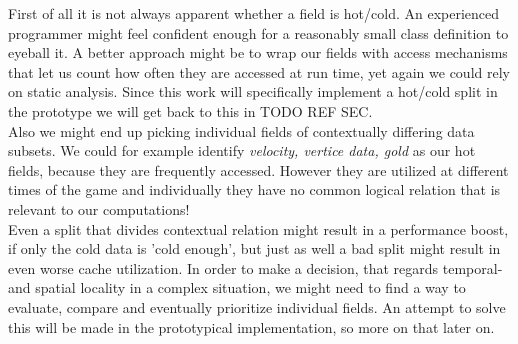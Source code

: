 First of all it is not always apparent whether a field is hot/cold. An experienced programmer might feel confident enough for a reasonably small class definition to eyeball it. A better approach might be to wrap our fields with access mechanisms that let us count how often they are accessed at run time, yet again we could rely on static analysis. Since this work will specifically implement a hot/cold split in the prototype we will get back to this in TODO REF SEC.\\
Also we might end up picking individual fields of contextually differing data subsets. We could for example identify \textit{velocity, vertice data, gold} as our hot fields, because they are frequently accessed. However they are utilized at different times of the game and individually they have no common logical relation that is relevant to our computations!\\
Even a split that divides contextual relation might result in a performance boost, if only the cold data is 'cold enough', but just as well a bad split might result in even worse cache utilization.
In order to make a decision, that regards temporal- and spatial locality in a complex situation, we might need to find a way to evaluate, compare and eventually prioritize individual fields. An attempt to solve this will be made in the prototypical implementation, so more on that later on.

